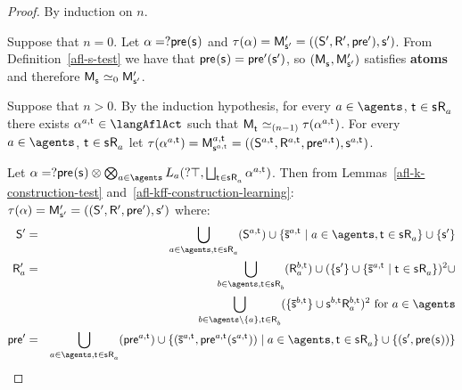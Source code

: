 \begin{proof}
By induction on $n$.

Suppose that $n = 0$. 
Let $\alpha = \test{\aPrecondition(\aStateS)}$ and $\tau(\alpha) = \aPModelP{\aStateSP} = \aPModelTupleP{\aStateSP}$. 
From Definition~\ref{afl-s-test} we have that $\aPrecondition(\aStateS) = \aPreconditionP(\aStateSP)$, so $(\aPModel{\aStateS}, \aPModelP{\aStateSP})$ satisfies {\bf atoms} and therefore $\aPModel{\aStateS} \bisimilar[0] \aPModelP{\aStateSP}$.

Suppose that $n > 0$. 
By the induction hypothesis, for every $\agentA \in \agents$, $\aStateT \in \aStateS \aAccessibility{\agentA}$ there exists $\alpha^{\agentA,\aStateT} \in \langAflAct$ such that 
$\aPModel{\aStateT} \bisimilar[(n - 1)] \tau(\alpha^{\agentA,\aStateT})$. 
For every $\agentA \in \agents$, $\aStateT \in \aStateS \aAccessibility{\agentA}$ let $\tau(\alpha^{\agentA,\aStateT}) = \aPModel[\agentA,\aStateT]{\aStateS[\agentA,\aStateT]} = \aPModelTuple[\agentA,\aStateT]{\aStateS[\agentA,\aStateT]}$.

Let $\alpha = \test{\aPrecondition(\aStateS)} \compose \bigcompose_{\agentA \in \agents} \learnsA (\test{\top}, \bigchoice_{\aStateT \in \aStateS \aAccessibility{\agentA}} \alpha^{\agentA,\aStateT})$.
Then from Lemmas~\ref{afl-k-construction-test} and~\ref{afl-kff-construction-learning}: $\tau(\alpha) = \aPModelP{\aStateSP} =\aPModelTupleP{\aStateSP}$ where:
\begin{eqnarray*}
    \aStatesP &=& \bigcup_{\agentA \in \agents, \aStateT \in \aStateS \aAccessibility{\agentA}} (\aStates[\agentA,\aStateT]) \cup \{\aPStateS[\agentA,\aStateT] \mid \agentA \in \agents, \aStateT \in \aStateS \aAccessibility{\agentA}\} \cup \{\aStateSP\}\\
    \aAccessibilityP{\agentA} &=& \bigcup_{\agentB \in \agents, \aStateT \in \aStateS \aAccessibility{\agentB}} (\aAccessibility[\agentB,\aStateT]{\agentA}) \cup (\{\aStateSP\} \cup \{\aPStateS[\agentA,\aStateT] \mid \aStateT \in \aStateS \aAccessibility{\agentA}\})^2 \cup\\&&\quad\bigcup_{\agentB \in \agents \setminus \{\agentA\}, \aStateT \in \aAccessibility{\agentB}} (\{\aPStateS[\agentB,\aStateT]\} \cup \aStateS[\agentB,\aStateT] \aAccessibility[\agentB,\aStateT]{\agentA})^2 \text{ for } \agentA \in \agents\\
    \aPreconditionP &=& \bigcup_{\agentA \in \agents, \aStateT \in \aStateS \aAccessibility{\agentA}} (\aPrecondition[\agentA,\aStateT]) \cup \{(\aPStateS[\agentA,\aStateT], \aPrecondition[\agentA,\aStateT](\aStateS[\agentA,\aStateT])) \mid \agentA \in \agents, \aStateT \in \aStateS \aAccessibility{\agentA}\} \cup \{(\aStateSP, \aPrecondition(\aStateS))\}
\end{eqnarray*}


\end{proof}
